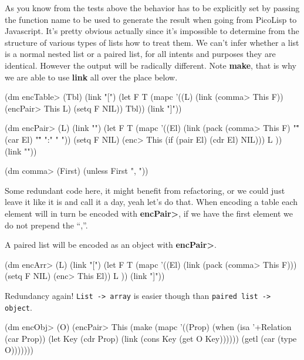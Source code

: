 As you know from the tests above the behavior has to be explicitly set
by passing the function name to be used to generate the result when
going from PicoLisp to Javascript. It's pretty obvious actually since
it's impossible to determine from the structure of various types of
lists how to treat them. We can't infer whether a list is a normal
nested list or a paired list, for all intents and purposes they are
identical. However the output will be radically different. Note
\textbf{make}, that is why we are able to use \textbf{link} all over
the place below.


\begin{wideverbatim}
(dm encTable> (Tbl)
  (link "[")
  (let F T 
     (mapc 
        '((L) 
            (link (comma> This F)) 
            (encPair> This L) 
            (setq F NIL)) Tbl))
  (link "]"))

(dm encPair> (L)    
  (link "{")
  (let F T 
     (mapc 
     '((El) 
         (link (pack (comma> This F) "\"" (car El) "\"" ":" " "))
         (setq F NIL)                  
         (enc> This (if (pair El) (cdr El) NIL))) L ))
  (link "}"))

(dm comma> (First)
   (unless First ", "))
\end{wideverbatim}

Some redundant code here, it might benefit from refactoring, or we
could just leave it like it is and call it a day, yeah let's do that.
When encoding a table each element will in turn be encoded with
\textbf{encPair\textgreater{}}, if we have the first element we do not
prepend the ``,''.

A paired list will be encoded as an object with
\textbf{encPair\textgreater{}}.


\begin{wideverbatim}
(dm encArr> (L)  
  (link "[")
  (let F T
     (mapc 
     '((El) 
         (link (pack (comma> This F)))
         (setq F NIL)
         (enc> This El)) L ))
  (link "]"))
\end{wideverbatim}

Redundancy again! \texttt{List -> array} is easier though than
\texttt{paired list -> object}.


\begin{wideverbatim}
(dm encObj> (O)
  (encPair> This 
     (make 
        (mapc 
           '((Prop)
               (when (isa '+Relation (car Prop)) 
                  (let Key (cdr Prop) 
                     (link (cons Key (get O Key)))))) (getl (car (type O)))))))
\end{wideverbatim}

